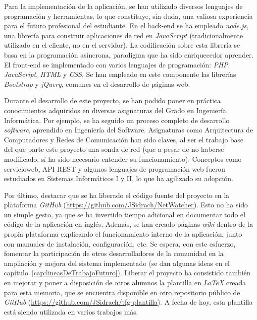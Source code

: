 Para la implementación de la aplicación, se han utilizado diversos lenguajes de programación y herramientas, lo que constituye, sin duda, una valiosa experiencia para el futuro profesional del estudiante.
En el \gls{back-end} se ha empleado \textit{node.js}, una librería para construir aplicaciones de red en \textit{JavaScript} (tradicionalmente utilizado en el cliente, no en el servidor).
La codificación sobre esta librería se basa en la programación asíncrona, paradigma que ha sido enriquecedor aprender.
El \gls{front-end} se implementado con varios lenguajes de programación: \textit{PHP}, \textit{JavaScript}, \textit{HTML} y \textit{CSS}.
Se han empleado en este componente las librerías \textit{Bootstrap} y \textit{jQuery}, comunes en el desarrollo de páginas web.

Durante el desarrollo de este proyecto, se han podido poner en práctica conocimientos adquiridos en diversas asignaturas del Grado en Ingeniería Informática.
Por ejemplo, se ha seguido un proceso completo de desarrollo \textit{software}, aprendido en Ingeniería del Software.
Asignaturas como Arquitectura de Computadores y Redes de Comunicación han sido claves, al ser el trabajo base del que parte este proyecto una sonda de red (que a pesar de no haberse modificado, sí ha sido necesario entender su funcionamiento).
Conceptos como \gls{servicioweb}, \gls{API} \gls{REST} y algunos lenguajes de programación web fueron estudiados en Sistemas Informáticos I y II, lo que ha agilizado su adopción.

Por último, destacar que se ha liberado el código fuente del proyecto en la plataforma \textit{GitHub} (\url{https://github.com/JSidrach/NetWatcher}).
Esto no ha sido un simple gesto, ya que se ha invertido tiempo adicional en documentar todo el código de la aplicación en inglés.
Además, se han creado páginas \textit{wiki} dentro de la propia plataforma explicando el funcionamiento interno de la aplicación, junto con manuales de instalación, configuración, etc.
Se espera, con este esfuerzo, fomentar la participación de otros desarrolladores de la comunidad en la ampliación y mejora del sistema implementado (se dan algunas ideas en el capítulo~\ref{cap:lineasDeTrabajoFuturo}).
Liberar el proyecto ha consistido también en mejorar y poner a disposición de otros alumnos la plantilla en \textit{LaTeX} creada para esta memoria, que se encuentra disponible en otro repositorio público de \textit{GitHub} (\url{https://github.com/JSidrach/tfg-plantilla}).
A fecha de hoy, esta plantilla está siendo utilizada en varios trabajos más.
